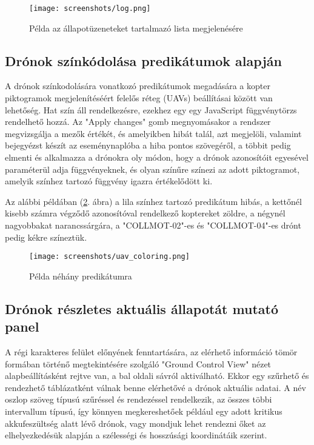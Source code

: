 \begin{figure}[H]
  \center
  \texttt{[image: screenshots/log.png]}
  \caption{Példa az állapotüzeneteket tartalmazó lista megjelenésére}
  \label{fig:log}
\end{figure}


\subsection{Drónok színkódolása predikátumok alapján}

A drónok színkodolására vonatkozó predikátumok megadására a kopter piktogramok
megjelenítéséért felelős réteg (UAVs) beállításai között van lehetőség.
Hat szín áll rendelkezésre, ezekhez egy egy JavaScript függvénytörzs rendelhető
hozzá. Az "Apply changes" gomb megnyomásakor a rendszer megvizsgálja a mezők
értékét, és amelyikben hibát talál, azt megjelöli, valamint bejegyézst készít az
eseménynaplóba a hiba pontos szövegéről, a többit pedig elmenti és alkalmazza a
drónokra oly módon, hogy a drónok azonosítóit egyesével paraméterül adja
függvényeknek, és olyan színűre színezi az adott piktogramot, amelyik színhez
tartozó függvény igazra értékelődött ki.

Az alábbi példában (\ref{fig:uav_coloring}. ábra) a lila színhez tartozó
predikátum hibás, a kettőnél kisebb számra végződő azonosítóval rendelkező
koptereket zöldre, a négynél nagyobbakat narancssárgára, a "COLLMOT-02"-es és
"COLLMOT-04"-es drónt pedig kékre színeztük.

\begin{figure}[H]
  \center
  \texttt{[image: screenshots/uav\_coloring.png]}
  \caption{Példa néhány predikátumra}
  \label{fig:uav_coloring}
\end{figure}

\subsection{Drónok részletes aktuális állapotát mutató panel}

A régi karakteres felület előnyének fenntartására, az elérhető információ tömör
formában történő megtekintésére szolgáló "Ground Control View" nézet
alapbeállításként rejtve van, a bal oldali sávról aktiválható. Ekkor egy
szűrhető és rendezhető táblázatként válnak benne elérhetővé a drónok aktuális
adatai.
A név oszlop szöveg típusú szűréssel és rendezéssel rendelkezik, az összes többi
intervallum típusú, így könnyen megkereshetőek például egy adott kritikus
akkufeszültség alatt lévő drónok, vagy mondjuk lehet rendezni őket az
elhelyezkedésük alapján a szélességi és hosszúsági koordinátáik szerint.

